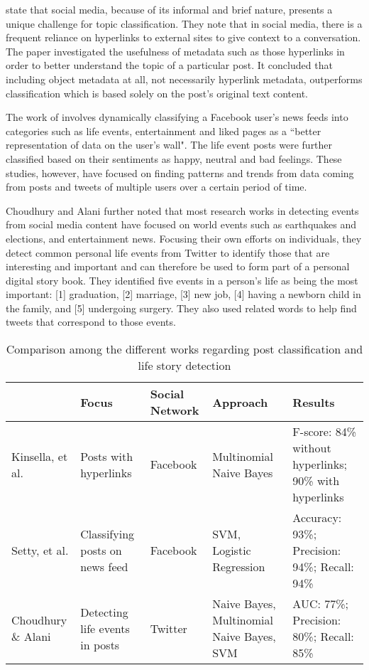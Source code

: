 \cite{DBLP:conf/ecir/KinsellaPB11} state that social media, because of its informal and brief nature, presents a unique challenge for topic classification. They note that in social media, there is a frequent reliance on hyperlinks to external sites to give context to a conversation. The paper investigated the usefulness of metadata such as those hyperlinks in order to better understand the topic of a particular post. It concluded that including object metadata at all, not necessarily hyperlink metadata, outperforms classification which is based solely on the post's original text content. 

The work of \cite{setty2014classification} involves dynamically classifying a Facebook user's news feeds into categories such as life events, entertainment and liked pages as a ``better representation of data on the user's wall". The life event posts were further classified based on their sentiments as happy, neutral and bad feelings. These studies, however, have focused on finding patterns and trends from data coming from posts and tweets of multiple users over a certain period of time. 

Choudhury and Alani \citeyear{choudhury2014personal} further noted that most research works in detecting events from social media content have focused on world events such as earthquakes and elections, and entertainment news. Focusing their own efforts on individuals, they detect common personal life events from Twitter to identify those that are interesting and important and can therefore be used to form part of a personal digital story book. They identified five events in a person's life as being the most important: [1] graduation, [2] marriage, [3] new job, [4] having a newborn child in the family, and [5] undergoing surgery. They also used related words to help find tweets that correspond to those events.

\clearpage
\begin{sidewaystable}[ph!]   %
	\centering
	\caption{Comparison among the different works regarding post classification and life story detection} \vspace{0.25em}
	\begin{tabular}{|p{1.5in}|p{1.5in}|p{1.5in}|p{1.5in}|p{1.5in}|} \hline
		\centering  & Focus & Social Network & Approach & Results \\ \hline
		Kinsella, et al. \citeyear{DBLP:conf/ecir/KinsellaPB11} & Posts with hyperlinks & Facebook & Multinomial Naive Bayes & F-score: 84\% without hyperlinks; 90\% with hyperlinks \\ \hline
		Setty, et al. \citeyear{setty2014classification} & Classifying posts on news feed & Facebook & SVM, Logistic Regression & Accuracy: 93\%; Precision: 94\%; Recall: 94\% \\ \hline
		Choudhury \& Alani \citeyear{choudhury2014personal} & Detecting life events in posts & Twitter & Naive Bayes, Multinomial Naive Bayes, SVM & AUC: 77\%; Precision: 80\%; Recall: 85\% \\ \hline
	\end{tabular}
	\label{tab:KnowledgeBase}
\end{sidewaystable}
\clearpage


